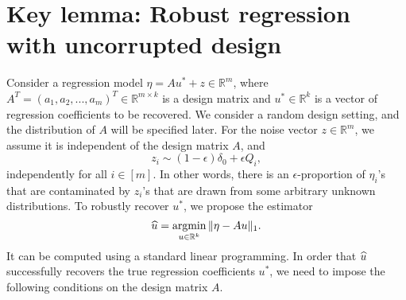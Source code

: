 


\section{Key lemma: Robust regression with uncorrupted design}
\label{sec:regression}

Consider a regression model $\eta=Au^*+z\in\mathbb{R}^m$, where $A^T=(a_1,a_2,...,a_m)^T\in\mathbb{R}^{m\times k}$ is a design matrix and $u^*\in\mathbb{R}^k$ is a vector of regression coefficients to be recovered. We consider a random design setting, and the distribution of $A$ will be specified later. For the noise vector $z\in\mathbb{R}^m$, we assume it is independent of the design matrix $A$, and
\begin{equation}
z_i\sim (1-\epsilon)\delta_0 + \epsilon Q_i, \label{eq:noise-add-con}
\end{equation}
independently for all $i\in[m]$. In other words, there is an $\epsilon$-proportion of $\eta_i$'s that are contaminated by $z_i$'s that are drawn from some arbitrary unknown distributions. To robustly recover $u^*$, we propose the estimator
$$\widehat{u}=\mathop{\rm argmin}_{u\in\mathbb{R}^k}\|\eta-Au\|_1.$$
It can be computed using a standard linear programming.
In order that $\widehat{u}$ successfully recovers the true regression coefficients $u^*$, we need to impose the following conditions on the design matrix $A$.

